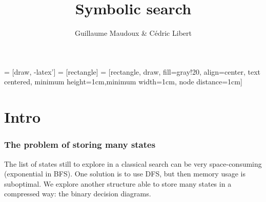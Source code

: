 \documentclass[10pt,a4paper,pdf]{beamer}
\author{Guillaume Maudoux \& Cédric Libert}
\title{Symbolic search}
\begin{document}
 = [draw, -latex']
 = [rectangle]
 = [rectangle, draw, fill=gray!20, align=center,
     text centered, minimum height=1cm,minimum width=1cm, node distance=1cm]	
\maketitle
\begin{frame}
\tableofcontents
\end{frame}
\section{Intro}
\begin{frame}
\frametitle{The problem of storing many states}

The list of states still to explore in a classical search can be very space-consuming (exponential in BFS).  One solution is to use DFS, but then memory usage is suboptimal.  We explore another structure able to store many states in a compressed way: the binary decision diagrams.

\end{frame}
\end{document}
